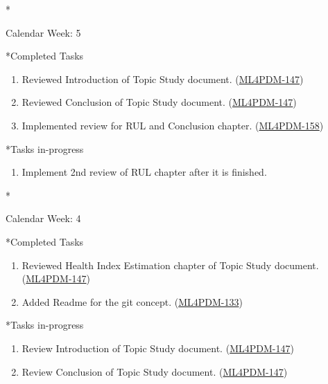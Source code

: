 \documentclass[11pt,a4paper]{article}
\begin{document}
\newpage
\begin{section}*{Calendar Week: 5 \hfill \date{5 February, 2021}}
 \begin{refsection}
   \begin{subsection}*{Completed Tasks}
     \begin{enumerate}
       \item
             Reviewed Introduction of Topic Study document. (\href{https://ml4pdm.atlassian.net/browse/ML4PDM-147}{ML4PDM-147})
       \item
             Reviewed Conclusion of Topic Study document. (\href{https://ml4pdm.atlassian.net/browse/ML4PDM-147}{ML4PDM-147})
       \item
             Implemented review for RUL and Conclusion chapter. (\href{https://ml4pdm.atlassian.net/browse/ML4PDM-158}{ML4PDM-158})
     \end{enumerate}
   \end{subsection}

   \begin{subsection}*{Tasks in-progress}
     \begin{enumerate}
       \item
             Implement 2nd review of RUL chapter after it is finished.
     \end{enumerate}
   \end{subsection}
 \end{refsection}
\end{section}

\newpage
\begin{section}*{Calendar Week: 4 \hfill \date{29 January, 2021}}
 \begin{refsection}
   \begin{subsection}*{Completed Tasks}
     \begin{enumerate}
       \item
             Reviewed Health Index Estimation chapter of Topic Study document. (\href{https://ml4pdm.atlassian.net/browse/ML4PDM-147}{ML4PDM-147})
       \item
             Added Readme for the git concept. (\href{https://ml4pdm.atlassian.net/browse/ML4PDM-133}{ML4PDM-133})
     \end{enumerate}
   \end{subsection}

   \begin{subsection}*{Tasks in-progress}
     \begin{enumerate}
       \item
             Review Introduction of Topic Study document. (\href{https://ml4pdm.atlassian.net/browse/ML4PDM-147}{ML4PDM-147})
       \item
             Review Conclusion of Topic Study document. (\href{https://ml4pdm.atlassian.net/browse/ML4PDM-147}{ML4PDM-147})
     \end{enumerate}
   \end{subsection}
 \end{refsection}
\end{section}
\end{document}
